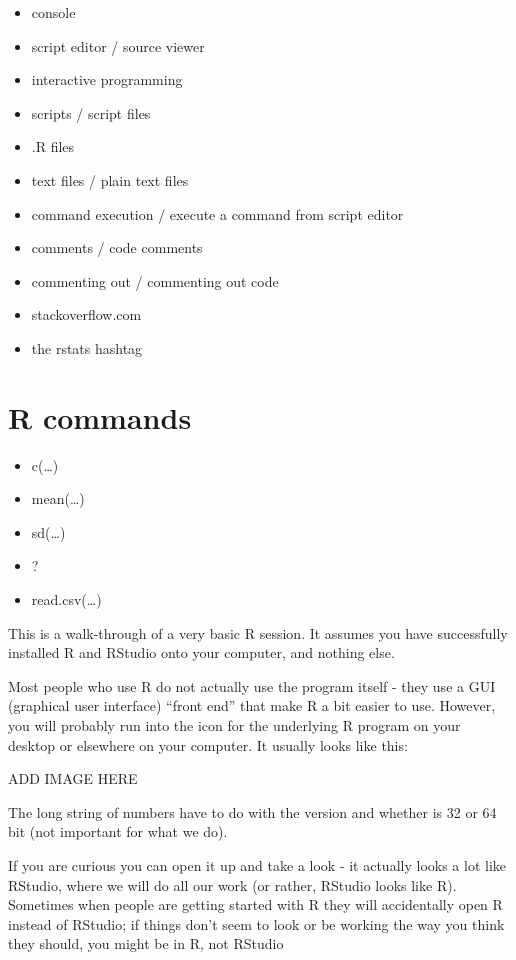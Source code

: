 \documentclass[
]{book}
\providecommand{\tightlist}{%
  \setlength{\itemsep}{0pt}\setlength{\parskip}{0pt}}
\begin{document}
\begin{itemize}
\tightlist
\item
  console
\item
  script editor / source viewer
\item
  interactive programming
\item
  scripts / script files
\item
  .R files
\item
  text files / plain text files
\item
  command execution / execute a command from script editor
\item
  comments / code comments
\item
  commenting out / commenting out code
\item
  stackoverflow.com
\item
  the rstats hashtag
\end{itemize}

\hypertarget{r-commands}{%
\section*{R commands}\label{r-commands}}

\begin{itemize}
\tightlist
\item
  c(\ldots)
\item
  mean(\ldots)
\item
  sd(\ldots)
\item
  ?
\item
  read.csv(\ldots)
\end{itemize}

This is a walk-through of a very basic R session. It assumes you have successfully installed R and RStudio onto your computer, and nothing else.

Most people who use R do not actually use the program itself - they use a GUI (graphical user interface) ``front end'' that make R a bit easier to use. However, you will probably run into the icon for the underlying R program on your desktop or elsewhere on your computer. It usually looks like this:

ADD IMAGE HERE

The long string of numbers have to do with the version and whether is 32 or 64 bit (not important for what we do).

If you are curious you can open it up and take a look - it actually looks a lot like RStudio, where we will do all our work (or rather, RStudio looks like R). Sometimes when people are getting started with R they will accidentally open R instead of RStudio; if things don't seem to look or be working the way you think they should, you might be in R, not RStudio
\end{document}
